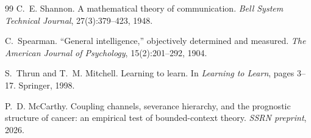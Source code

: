 \documentclass[11pt]{article}
\theoremstyle{definition}
\theoremstyle{remark}
\begin{document}
\begin{thebibliography}{99}
C.~E. Shannon.
\newblock A mathematical theory of communication.
\newblock \emph{Bell System Technical Journal}, 27(3):379--423, 1948.

C.~Spearman.
\newblock ``General intelligence,'' objectively determined and measured.
\newblock \emph{The American Journal of Psychology}, 15(2):201--292, 1904.

S.~Thrun and T.~M. Mitchell.
\newblock Learning to learn.
\newblock In \emph{Learning to Learn}, pages 3--17. Springer, 1998.

P.~D. McCarthy.
\newblock Coupling channels, severance hierarchy, and the prognostic
structure of cancer: an empirical test of bounded-context theory.
\newblock \emph{SSRN preprint}, 2026.

\end{thebibliography}
\end{document}
